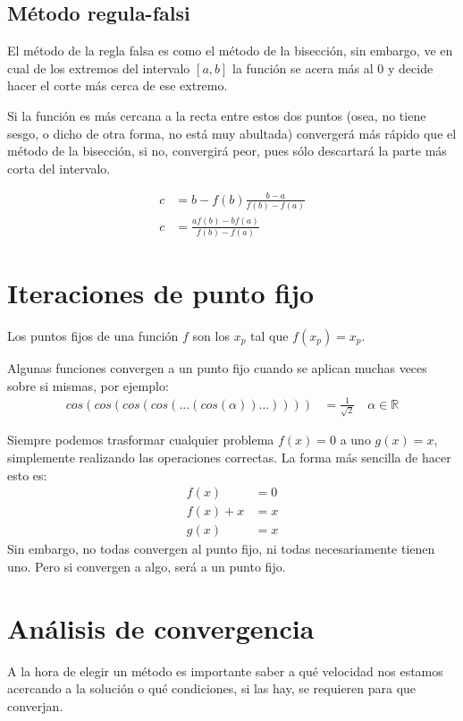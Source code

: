 \documentclass[spanish, fleqn]{article}
\begin{document}
\subsection{Método regula-falsi}

El método de la regla falsa es como el método de la bisección, sin embargo, ve en cual de los extremos del intervalo $[a,b]$ la función se acera más al $0$ y decide hacer el corte más cerca de ese extremo.

Si la función es más cercana a la recta entre estos dos puntos (osea, no tiene sesgo, o dicho de otra forma, no está muy abultada) convergerá más rápido que el método de la bisección, si no, convergirá peor, pues sólo descartará la parte más corta del intervalo.

\begin{align*}
c&= b-f(b)\frac{b-a}{f(b)-f(a)}
\\ c&= \frac{af(b)- bf(a)}{f(b)-f(a)}
\end{align*}

\section{Iteraciones de punto fijo}

Los puntos fijos de una función $f$ son los $x_p$ tal que $f(x_p)=x_p$.

Algunas funciones convergen a un punto fijo cuando se aplican muchas veces sobre si mismas, por ejemplo:
\begin{align*}
cos(cos(cos(cos(...(cos(\alpha))...))))&= \frac{1}{\sqrt{2}} \quad \alpha \in \mathbb{R}
\end{align*}

Siempre podemos trasformar cualquier problema $f(x)=0$ a uno $g(x)=x$, simplemente realizando las operaciones correctas. La forma más sencilla de hacer esto es:
\begin{align*}
f(x)&=0
\\f(x)+x&=x
\\g(x)&=x
\end{align*}
Sin embargo, no todas convergen al punto fijo, ni todas necesariamente tienen uno. Pero si convergen a algo, será a un punto fijo.

\section{Análisis de convergencia}

A la hora de elegir un método es importante saber a qué velocidad nos estamos acercando a la solución o qué condiciones, si las hay, se requieren para que converjan.
\end{document}
